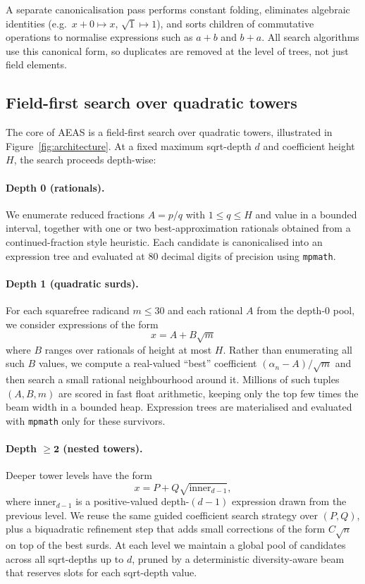 \documentclass[11pt]{article}
\begin{document}
A separate canonicalisation pass performs constant folding, eliminates algebraic identities (e.g.\ $x+0 \mapsto x$, $\sqrt{1}\mapsto 1$), and sorts children of commutative operations to normalise expressions such as $a+b$ and $b+a$.
All search algorithms use this canonical form, so duplicates are removed at the level of trees, not just field elements.

\subsection{Field-first search over quadratic towers}

The core of AEAS is a field-first search over quadratic towers, illustrated in Figure~\ref{fig:architecture}.
At a fixed maximum sqrt-depth $d$ and coefficient height $H$, the search proceeds depth-wise:

\paragraph{Depth 0 (rationals).}
We enumerate reduced fractions $A = p/q$ with $1 \le q \le H$ and value in a bounded interval, together with one or two best-approximation rationals obtained from a continued-fraction style heuristic.
Each candidate is canonicalised into an expression tree and evaluated at $80$ decimal digits of precision using \texttt{mpmath}.

\paragraph{Depth 1 (quadratic surds).}
For each squarefree radicand $m \le 30$ and each rational $A$ from the depth-0 pool, we consider expressions of the form
\[
  x = A + B\sqrt{m}
\]
where $B$ ranges over rationals of height at most $H$.
Rather than enumerating all such $B$ values, we compute a real-valued ``best'' coefficient $(\alpha_n - A)/\sqrt{m}$ and then search a small rational neighbourhood around it.
Millions of such tuples $(A,B,m)$ are scored in fast float arithmetic, keeping only the top few times the beam width in a bounded heap.
Expression trees are materialised and evaluated with \texttt{mpmath} only for these survivors.

\paragraph{Depth $\bm{\ge 2}$ (nested towers).}
Deeper tower levels have the form
\[
  x = P + Q\sqrt{\text{inner}_{d-1}},
\]
where $\text{inner}_{d-1}$ is a positive-valued depth-$(d-1)$ expression drawn from the previous level.
We reuse the same guided coefficient search strategy over $(P,Q)$, plus a biquadratic refinement step that adds small corrections of the form $C\sqrt{n}$ on top of the best surds.
At each level we maintain a global pool of candidates across all sqrt-depths up to $d$, pruned by a deterministic diversity-aware beam that reserves slots for each sqrt-depth value.
\end{document}
